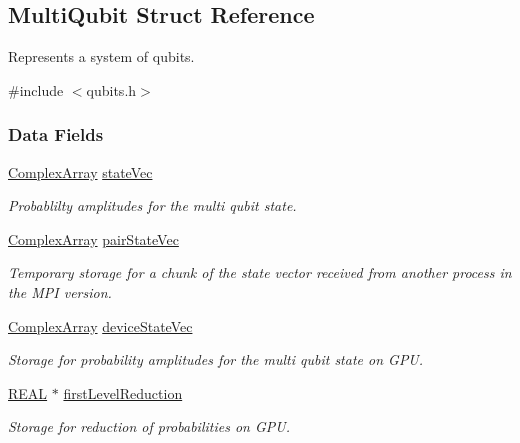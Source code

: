 \hypertarget{structMultiQubit}{}\subsection{Multi\+Qubit Struct Reference}
\label{structMultiQubit}


Represents a system of qubits.  




{\ttfamily \#include $<$qubits.\+h$>$}

\subsubsection*{Data Fields}
\begin{DoxyCompactItemize}
\item 
\mbox{\hyperlink{structComplexArray}{Complex\+Array}} \mbox{\hyperlink{structMultiQubit_a45483190d6b01ef6b2f98f2bec9ab94f}{state\+Vec}}
\begin{DoxyCompactList}\small\item\em Probablilty amplitudes for the multi qubit state. \end{DoxyCompactList}\item 
\mbox{\hyperlink{structComplexArray}{Complex\+Array}} \mbox{\hyperlink{structMultiQubit_a76f7db4eab52d2b30f58f973ada809c5}{pair\+State\+Vec}}
\begin{DoxyCompactList}\small\item\em Temporary storage for a chunk of the state vector received from another process in the M\+PI version. \end{DoxyCompactList}\item 
\mbox{\hyperlink{structComplexArray}{Complex\+Array}} \mbox{\hyperlink{structMultiQubit_a59ac613486a41b8c9a4b6e79cc8d2cc3}{device\+State\+Vec}}
\begin{DoxyCompactList}\small\item\em Storage for probability amplitudes for the multi qubit state on G\+PU. \end{DoxyCompactList}\item 
\mbox{\hyperlink{precision_8h_a4b654506f18b8bfd61ad2a29a7e38c25}{R\+E\+AL}} $\ast$ \mbox{\hyperlink{structMultiQubit_a4e0088b41adab0a40b7a31e528ed42b5}{first\+Level\+Reduction}}
\begin{DoxyCompactList}\small\item\em Storage for reduction of probabilities on G\+PU. \end{DoxyCompactList}\item 

\end{DoxyCompactItemize}
